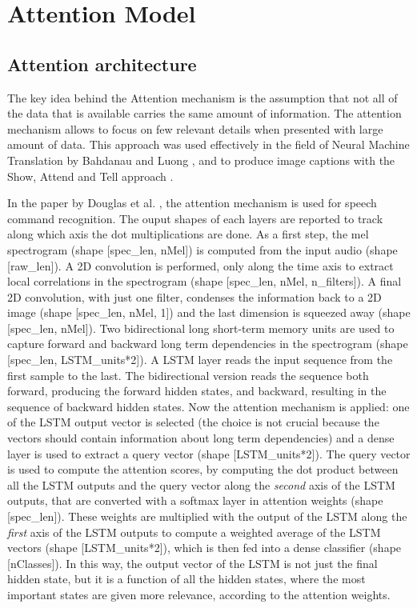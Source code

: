 \section{Attention Model}
\label{sec:attention_model}

\subsection{Attention architecture}

The key idea behind the Attention mechanism is the assumption that not all of
the data that is available carries the same amount of information.
The attention mechanism allows to focus on few relevant details when presented
with large amount of data.
This approach was used effectively in the field of Neural Machine Translation
by Bahdanau \cite{bahdanau2016neural} and Luong \cite{luong2015effective}, and
to produce image captions with the Show, Attend and Tell approach
\cite{xu2016show}.

In the paper by Douglas et al. \cite{2018arXiv180808929C}, the attention
mechanism is used for speech command recognition.
The ouput shapes of each layers are reported to track along which axis the dot
multiplications are done.
As a first step, the mel spectrogram
(shape [spec\_len, nMel])
is computed from the input audio
(shape [raw\_len]).
A 2D convolution is performed, only along the time axis to extract local
correlations in the spectrogram
(shape [spec\_len, nMel, n\_filters]).
A final 2D convolution, with just one filter, condenses the information back to a 2D image
(shape [spec\_len, nMel, 1])
and the last dimension is squeezed away
(shape [spec\_len, nMel]).
Two bidirectional \cite{Schuster1997BidirectionalRN} long short-term memory
\cite{lstm} units are used to capture forward and backward long term
dependencies in the spectrogram
(shape [spec\_len, LSTM\_units*2]).
A LSTM layer reads the input sequence from the first sample to the last. The
bidirectional version reads the sequence both forward, producing the forward
hidden states, and backward, resulting in the sequence of backward hidden
states.
Now the attention mechanism is applied: one of the LSTM output vector is
selected (the choice is not crucial because the vectors should contain
information about long term dependencies) and a dense layer is used to extract
a query vector
(shape [LSTM\_units*2]).
The query vector is used to compute the attention scores, by computing the dot
product between all the LSTM outputs and the query vector along the
\textit{second} axis of the LSTM outputs, that are converted with a softmax
layer in attention weights
(shape [spec\_len]).
These weights are multiplied with the output of the LSTM along the
\textit{first} axis of the LSTM outputs to compute a weighted average of the
LSTM vectors
(shape [LSTM\_units*2]),
which is then fed into a dense classifier
(shape [nClasses]).
In this way, the output vector of the LSTM is not just the final hidden state,
but it is a function of all the hidden states, where the most important states
are given more relevance, according to the attention weights.

